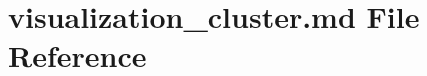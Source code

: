 \hypertarget{visualization__cluster_8md}{}\section{visualization\+\_\+cluster.\+md File Reference}
\label{visualization__cluster_8md}
